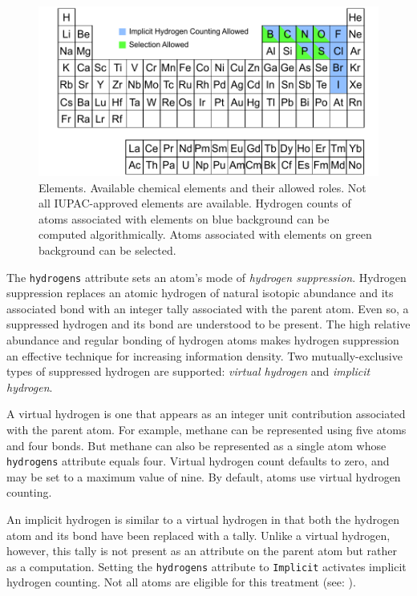 \documentclass{article}
\def\ttt{\texttt}
\begin{document}
\begin{figure}
    \centering
    \includegraphics[width=\columnwidth]{periodic-table.pdf}
    \caption{Elements. Available chemical elements and their allowed roles. Not all IUPAC-approved elements are available. Hydrogen counts of atoms associated with elements on blue background can be computed algorithmically. Atoms associated with elements on green background can be selected.}
    \label{fig:periodic-table}
\end{figure}

The \ttt{hydrogens} attribute sets an atom's mode of \textit{hydrogen suppression}. Hydrogen suppression replaces an atomic hydrogen of natural isotopic abundance and its associated bond with an integer tally associated with the parent atom. Even so, a suppressed hydrogen and its bond are understood to be present. The high relative abundance and regular bonding of hydrogen atoms makes hydrogen suppression an effective technique for increasing information density. Two mutually-exclusive types of suppressed hydrogen are supported: \textit{virtual hydrogen} and \textit{implicit hydrogen}.

A virtual hydrogen is one that appears as an integer unit contribution associated with the parent atom. For example, methane can be represented using five atoms and four bonds. But methane can also be represented as a single atom whose \ttt{hydrogens} attribute equals four. Virtual hydrogen count defaults to zero, and may be set to a maximum value of nine. By default, atoms use virtual hydrogen counting.

An implicit hydrogen is similar to a virtual hydrogen in that both the hydrogen atom and its bond have been replaced with a tally. Unlike a virtual hydrogen, however, this tally is not present as an attribute on the parent atom but rather as a computation. Setting the \ttt{hydrogens} attribute to \ttt{Implicit} activates implicit hydrogen counting. Not all atoms are eligible for this treatment (see: ).
\end{document}

